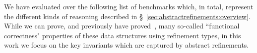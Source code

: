 \begin{comment}
\mypara{Implementation}
%
\toolname verifies the contents of a single file (module) at a time as follows. 
%
First, the Haskell source is fed into GHC, which desugars the program
to GHC's ``core" intermediate representation~\cite{VytiniotisJM12}.
%
Second, the desugared program,
the type signatures for the module functions (which are to be verified) and 
the type signatures for externally imported functions (which are assumed to hold)
are sent to the constraint generator, which traverses the core bindings in a
syntax-directed manner to generate subtyping constraints.
%
The resulting constraints are simplified via our subtyping rules
(\S~\ref{sec:abstractrefinements:check}) into simple logical implication
constraints.
%
Finally, the implication constraints, together with the logical
qualifiers provided by the user and harvested from the type
signatures, are sent into an SMT- and abstract interpretation-based
fixpoint computation procedure that determines if the constraints are
satisfiable \cite{GrafSaidi97,Houdini}.
%
If so, the program is reported to be \emph{safe}.
%
Otherwise, each unsatisfiable constraint is mapped back to the
corresponding program source location that generated it and a
potential error is reported at that line in the program.
\end{comment}

We have evaluated \toolname over the following list of benchmarks
which, in total, represent the different kinds of reasoning described in
\S~\ref{sec:abstractrefinements:overview}.
%
While we can prove, and previously have proved~\cite{LiquidPLDI09},
many so-called ``functional correctness" properties of these data
structures using refinement types, in this work we focus on the key
invariants which are captured by abstract refinements.

